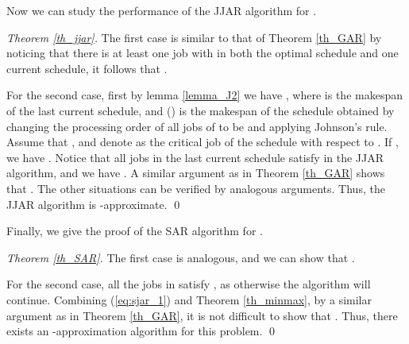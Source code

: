 \documentclass{llncs}
\numberwithin{subcase}{case}
\begin{document}
Now we can study the performance of the JJAR algorithm for .
\begin{proof}[Theorem \ref{th_jjar}]
The first case is similar to that of Theorem \ref{th_GAR} by noticing that there is at least one job with  in both the optimal schedule and one current schedule, it follows that .

For the second case, first by lemma \ref{lemma_J2} we have , where  is the makespan of the last current schedule, and  () is the makespan of the schedule obtained by changing the processing order of all jobs of  to be   and applying Johnson's rule. Assume that , and denote  as the critical job of the schedule with respect to . If , we have . Notice that all jobs in the last current schedule satisfy  in the JJAR algorithm, and we have . A similar argument as in Theorem \ref{th_GAR} shows that . The other situations can be verified by analogous arguments. Thus, the JJAR algorithm is -approximate.
\qed
\end{proof}

Finally, we give the proof of the SAR algorithm for .
\begin{proof}[Theorem \ref{th_SAR}]
The first case is analogous, and we can show that .

For the second case, all the jobs in  satisfy , as otherwise the algorithm will continue. Combining (\ref{eq:sjar_1}) and Theorem \ref{th_minmax}, by a similar argument as in Theorem \ref{th_GAR}, it is not difficult to show that . Thus, there exists an -approximation algorithm for this problem.
\qed
\end{proof}
\end{document}
